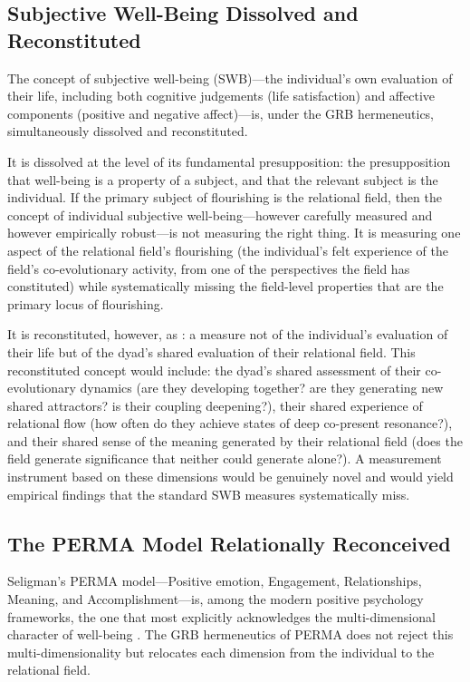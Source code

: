 \subsection{Subjective Well-Being Dissolved and Reconstituted}
\label{p14:subsec:swb-grb}

\noindent
The concept of subjective well-being (SWB)---the individual's own evaluation of their life, including both cognitive judgements (life satisfaction) and affective components (positive and negative affect)---is, under the GRB hermeneutics, simultaneously dissolved and reconstituted.

It is dissolved at the level of its fundamental presupposition: the presupposition that well-being is a property of a subject, and that the relevant subject is the individual. If the primary subject of flourishing is the relational field, then the concept of individual subjective well-being---however carefully measured and however empirically robust---is not measuring the right thing. It is measuring one aspect of the relational field's flourishing (the individual's felt experience of the field's co-evolutionary activity, from one of the perspectives the field has constituted) while systematically missing the field-level properties that are the primary locus of flourishing.

It is reconstituted, however, as : a measure not of the individual's evaluation of their life but of the dyad's shared evaluation of their relational field. This reconstituted concept would include: the dyad's shared assessment of their co-evolutionary dynamics (are they developing together? are they generating new shared attractors? is their coupling deepening?), their shared experience of relational flow (how often do they achieve states of deep co-present resonance?), and their shared sense of the meaning generated by their relational field (does the field generate significance that neither could generate alone?). A measurement instrument based on these dimensions would be genuinely novel and would yield empirical findings that the standard SWB measures systematically miss.

\subsection{The PERMA Model Relationally Reconceived}
\label{p14:subsec:perma-grb}

\noindent
Seligman's PERMA model---Positive emotion, Engagement, Relationships, Meaning, and Accomplishment---is, among the modern positive psychology frameworks, the one that most explicitly acknowledges the multi-dimensional character of well-being \parencite{seligman2011}. The GRB hermeneutics of PERMA does not reject this multi-dimensionality but relocates each dimension from the individual to the relational field.

